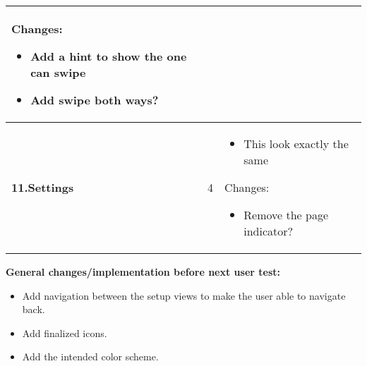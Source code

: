 \begin{center}
\begin{longtable}{ | p{4cm} | p{3cm} | p{9cm}|}
		Changes:
		\begin{itemize}
			\item Add a hint to show the one can swipe
			\item 	Add swipe both ways?
		\end{itemize}
		
		\\\hline
		\textbf{11.Settings} & 4   & 
		\begin{itemize}
			\item This look exactly the same
		\end{itemize}
		Changes: 
		\begin{itemize}
			\item Remove the page indicator?
		\end{itemize}
		\\ \hline
	\end{longtable}
\end{center}

\textbf{General changes/implementation before next user test:}
\begin{itemize}
\item Add navigation between the setup views to make the user able to navigate back.
\item Add finalized icons.
\item Add the intended color scheme.
\end{itemize}

\cleardoublepage